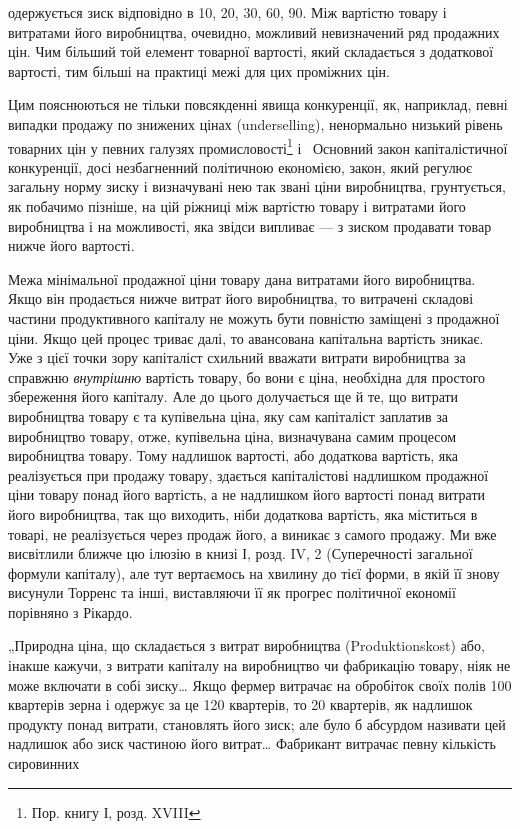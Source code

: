 \parcont{}  %
одержується зиск відповідно в 10, 20, 30, 60, 90.
Між вартістю товару і витратами його виробництва, очевидно,
можливий невизначений ряд продажних цін. Чим більший
той елемент товарної вартості, який складається з додаткової
вартості, тим більші на практиці межі для цих проміжних цін.

Цим пояснюються не тільки повсякденні явища конкуренції,
як, наприклад, певні випадки продажу по знижених цінах (underselling),
ненормально низький рівень товарних цін у певних
галузях промисловості\footnote{
Пор. книгу І, розд. XVIII
} і~ Основний закон капіталістичної
конкуренції, досі незбагненний політичною економією, закон,
який регулює загальну норму зиску і визначувані нею так
звані ціни виробництва, грунтується, як побачимо пізніше, на
цій ріжниці між вартістю товару і витратами його виробництва
і на можливості, яка звідси випливає — з зиском продавати
товар нижче його вартості.

Межа мінімальної продажної ціни товару дана витратами
його виробництва. Якщо він продається нижче витрат його
виробництва, то витрачені складові частини продуктивного капіталу
не можуть бути повністю заміщені з продажної ціни.
Якщо цей процес триває далі, то авансована капітальна вартість
зникає. Уже з цієї точки зору капіталіст схильний вважати витрати
виробництва за справжню \emph{внутрішню} вартість товару, бо
вони є ціна, необхідна для простого збереження його капіталу.
Але до цього долучається ще й те, що витрати виробництва
товару є та купівельна ціна, яку сам капіталіст заплатив за
виробництво товару, отже, купівельна ціна, визначувана самим
процесом виробництва товару. Тому надлишок вартості, або
додаткова вартість, яка реалізується при продажу товару,
здається капіталістові надлишком продажної ціни товару понад
його вартість, а не надлишком його вартості понад витрати його
виробництва, так що виходить, ніби додаткова вартість, яка
міститься в товарі, не реалізується через продаж його, а виникає
з самого продажу. Ми вже висвітлили ближче цю ілюзію
в книзі І, розд. IV, 2 (Суперечності загальної формули капіталу),
але тут вертаємось на хвилину до тієї форми, в якій її
знову висунули Торренс та інші, виставляючи її як прогрес політичної
економії порівняно з Рікардо.

„Природна ціна, що складається з витрат виробництва (Produktionskost)
або, інакше кажучи, з витрати капіталу на виробництво
чи фабрикацію товару, ніяк не може включати в собі
зиску\dots{} Якщо фермер витрачає на обробіток своїх полів 100
квартерів зерна і одержує за це 120 квартерів, то 20 квартерів,
як надлишок продукту понад витрати, становлять його зиск;
але було б абсурдом називати цей надлишок або зиск частиною
його витрат\dots{} Фабрикант витрачає певну кількість сировинних
\parbreak{}  %
